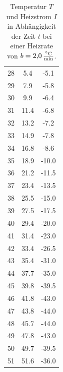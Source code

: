 \begin{table}
\begin{tabular}{| S[table-format=2.0] S[table-format=2.0] S[table-format=2.0]}
        28 & 5.4 & -5.1 \\
        29 & 7.9 & -5.8 \\
        30 & 9.9 & -6.4 \\
        31 & 11.4 & -6.8 \\
        32 & 13.2 & -7.2 \\
        33 & 14.9 & -7.8 \\
        34 & 16.8 & -8.6 \\
        35 & 18.9 & -10.0 \\
        36 & 21.2 & -11.5 \\
        37 & 23.4 & -13.5 \\
        38 & 25.5 & -15.0 \\
        39 & 27.5 & -17.5 \\
        40 & 29.4 & -20.0 \\
        41 & 31.4 & -23.0 \\
        42 & 33.4 & -26.5 \\
        43 & 35.4 & -31.0 \\
        44 & 37.7 & -35.0 \\
        45 & 39.8 & -39.5 \\
        46 & 41.8 & -43.0 \\
        47 & 43.8 & -44.0 \\
        48 & 45.7 & -44.0 \\
        49 & 47.8 & -43.0 \\
        50 & 49.7 & -39.5 \\
        51 & 51.6 & -36.0 \\
        \bottomrule
    \end{tabular}
    \caption{Temperatur $T$ und Heizstrom $I$ in Abhängigkeit der Zeit $t$ bei einer Heizrate von $b = \SI{2.0}{\frac{\degreeCelsius}{\minute}}$.}
    \label{tab:daten_20}
\end{table}

